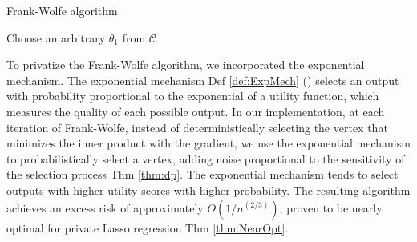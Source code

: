 \documentclass[12pt,letterpaper]{article}
\begin{document}
\begin{algorithm}[H]
    \DontPrintSemicolon
    \caption{Frank-Wolfe algorithm}
    \label{alg:FW}
    Choose an arbitrary $\theta_{1}$ from $\mathcal{C}$\;
    \;
\end{algorithm}

To privatize the Frank-Wolfe algorithm, we incorporated the exponential mechanism. The exponential mechanism Def \ref{def:ExpMech} (\cite{ExpMech}) selects an output with probability proportional to the exponential of a utility function, which measures the quality of each possible output. In our implementation, at each iteration of Frank-Wolfe, instead of deterministically selecting the vertex that minimizes the inner product with the gradient, we use the exponential mechanism to probabilistically select a vertex, adding noise proportional to the sensitivity of the selection process Thm \ref{thm:dp}. The exponential mechanism tends to select outputs with higher utility scores with higher probability. The resulting algorithm achieves an excess risk of approximately $O(1/n^{(2/3)})$, proven to be nearly optimal for private Lasso regression Thm \ref{thm:NearOpt}.
\end{document}
